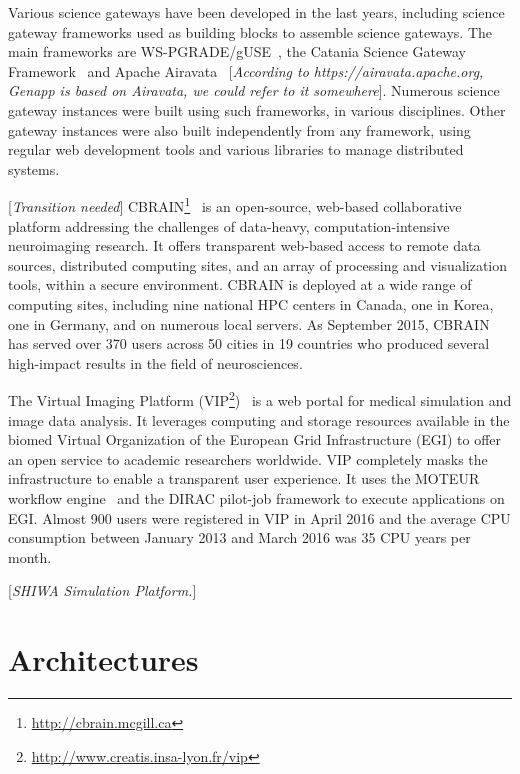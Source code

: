 \documentclass[preprint,3p,twocolumn]{elsarticle}
\newcommand{\todo}[1]{\color{blue}\xspace[\emph{#1}]\xspace\color{black}}
\begin{document}
Various science gateways have been developed in the last years,
including science gateway frameworks used as building blocks to
assemble science gateways. The main frameworks are
WS-PGRADE/gUSE~\cite{Kacsuk2012}, the Catania Science Gateway
Framework~\cite{Ardizzone2012} and Apache
Airavata~\cite{marru2011apache} \todo{According to
  https://airavata.apache.org, Genapp is based on Airavata, we could
  refer to it somewhere}. Numerous science gateway instances were
built using such frameworks, in various disciplines. Other gateway
instances were also built independently from any framework, using
regular web development tools and various libraries to manage
distributed systems.

\todo{Transition needed}
CBRAIN\footnote{\url{http://cbrain.mcgill.ca}}~\cite{SHER-14} is an
open-source, web-based collaborative platform addressing the
challenges of data-heavy, computation-intensive neuroimaging
research. It offers transparent web-based access to remote data
sources, distributed computing sites, and an array of processing and
visualization tools, within a secure environment. CBRAIN is deployed
at a wide range of computing sites, including nine national HPC
centers in Canada, one in Korea, one in Germany, and on numerous local
servers. As September 2015, CBRAIN has served over 370 users across 50
cities in 19 countries who produced several high-impact results in the
field of neurosciences.

The Virtual Imaging Platform
(VIP\footnote{\url{http://www.creatis.insa-lyon.fr/vip}})~\cite{GLAT-13}
is a web portal for medical simulation and image data analysis. It
leverages computing and storage resources available in the biomed
Virtual Organization of the European Grid Infrastructure (EGI) to
offer an open service to academic researchers worldwide. VIP
completely masks the infrastructure to enable a transparent user
experience. It uses the MOTEUR workflow engine~\cite{GLAT-13} and the
DIRAC pilot-job framework to execute applications on EGI. Almost 900
users were registered in VIP in April 2016 and the average CPU
consumption between January 2013 and March 2016 was 35 CPU years per
month.

\todo{SHIWA Simulation Platform.}

\section{Architectures}
\label{sec:architectures}
\end{document}
